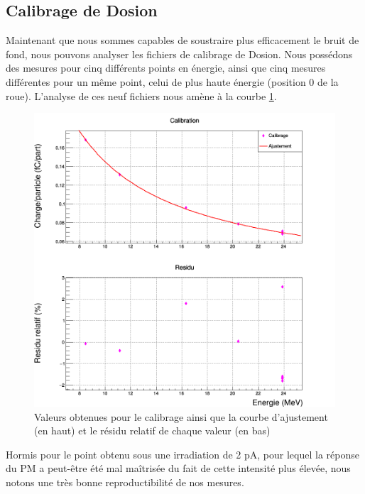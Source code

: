 \documentclass[a4paper,11pt]{article}
\begin{document}
\subsection*{Calibrage de Dosion}
Maintenant que nous sommes capables de soustraire plus efficacement le bruit de fond, nous pouvons analyser les fichiers de calibrage de Dosion.
Nous possédons des mesures pour cinq différents points en énergie, ainsi que cinq mesures différentes pour un même point, celui de plus haute énergie (position 0 de la roue). 
L’analyse de ces neuf fichiers nous amène à la courbe \ref{fig:calibp}.
\begin{figure}[h]
\begin{center}
\includegraphics[scale=0.4]{Calibrationp.png} 
\caption{\label{fig:calibp}\footnotesize{Valeurs obtenues pour le calibrage ainsi que la courbe d'ajustement (en haut) et le résidu relatif de chaque valeur (en bas)}}
\end{center}
\end{figure}

Hormis pour le point obtenu sous une irradiation de 2 pA, pour lequel la réponse du PM a peut-être été mal maîtrisée du fait de cette intensité plus élevée, nous notons une très bonne reproductibilité de nos mesures.
\end{document}
